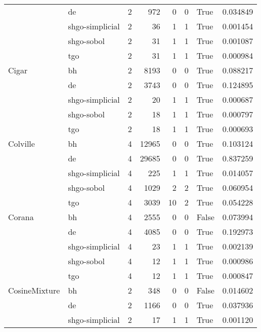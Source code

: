 \begin{longtable}{llrrrrlr}
         & de &     2 &      972 &      0 &       0 &    True &    0.034849 \\
         & shgo-simplicial &     2 &       36 &      1 &       1 &    True &    0.001454 \\
         & shgo-sobol &     2 &       31 &      1 &       1 &    True &    0.001087 \\
         & tgo &     2 &       31 &      1 &       1 &    True &    0.000984 \\
Cigar & bh &     2 &     8193 &      0 &       0 &    True &    0.088217 \\
         & de &     2 &     3743 &      0 &       0 &    True &    0.124895 \\
         & shgo-simplicial &     2 &       20 &      1 &       1 &    True &    0.000687 \\
         & shgo-sobol &     2 &       18 &      1 &       1 &    True &    0.000797 \\
         & tgo &     2 &       18 &      1 &       1 &    True &    0.000693 \\
Colville & bh &     4 &    12965 &      0 &       0 &    True &    0.103124 \\
         & de &     4 &    29685 &      0 &       0 &    True &    0.837259 \\
         & shgo-simplicial &     4 &      225 &      1 &       1 &    True &    0.014057 \\
         & shgo-sobol &     4 &     1029 &      2 &       2 &    True &    0.060954 \\
         & tgo &     4 &     3039 &     10 &       2 &    True &    0.054228 \\
Corana & bh &     4 &     2555 &      0 &       0 &   False &    0.073994 \\
         & de &     4 &     4085 &      0 &       0 &    True &    0.192973 \\
         & shgo-simplicial &     4 &       23 &      1 &       1 &    True &    0.002139 \\
         & shgo-sobol &     4 &       12 &      1 &       1 &    True &    0.000986 \\
         & tgo &     4 &       12 &      1 &       1 &    True &    0.000847 \\
CosineMixture & bh &     2 &      348 &      0 &       0 &   False &    0.014602 \\
         & de &     2 &     1166 &      0 &       0 &    True &    0.037936 \\
         & shgo-simplicial &     2 &       17 &      1 &       1 &    True &    0.001120 \\

\end{longtable}

